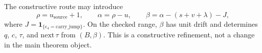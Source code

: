 \begin{remark}
The constructive route may introduce
\[
\rho=u_{\mathrm{source}}+1,
\qquad
\alpha=\rho-u,
\qquad
\beta=\alpha-(s+v+\lambda)-J,
\]
where $J=\mathbf 1_{\{\epsilon_4=\mathrm{carry\_jump}\}}$. On the checked range,
$\beta$ has unit drift and determines $q$, $c$, $\tau$, and $\mathrm{next}\,\tau$
from $(B,\beta)$. This is a constructive refinement, not a change in the main
theorem object.
\end{remark}
